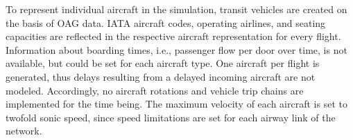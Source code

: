 %



To represent individual aircraft in the simulation, transit vehicles are created on the basis of OAG data. 
IATA aircraft codes, operating airlines, and seating capacities are reflected in the respective aircraft representation for every flight. 
Information about boarding times, i.e., passenger flow per door over time, is not available, but could be set for each aircraft type. 
One aircraft per flight is generated, thus delays resulting from a delayed incoming aircraft are not modeled.
Accordingly, no aircraft rotations and vehicle trip chains are implemented for the time being. 
The maximum velocity of each aircraft is set to twofold sonic speed, since speed limitations are set for each airway link of the network. 




